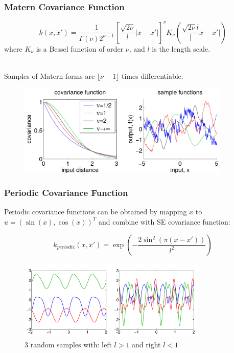 \documentclass[10pt]{beamer}
\begin{document}
  \begin{frame}
    \frametitle{Matern Covariance Function}

    \begin{equation*}
      k(x,x') = \frac{1}{\Gamma(\nu) 2^{\nu - 1}} \left[ \frac{\sqrt{2 \nu}}{l} |x - x'| \right]^{\nu} K_{\nu} \left( \frac{\sqrt{2 \nu}{l}} |x - x'| \right)
    \end{equation*}
    where $K_{\nu}$ is a Bessel function of order $\nu$, and $l$ is the length scale.\\~

    Samples of Matern forms are $\lfloor \nu - 1 \rfloor$ times differentiable.

    \begin{figure}
      \centering
      \includegraphics[width=0.9\textwidth]{maternCovFunc.png}
    \end{figure}

  \end{frame}

  \begin{frame}
    \frametitle{Periodic Covariance Function}
    Periodic covariance functions can be obtained by mapping $x$ to $u = (\sin(x), \cos(x))^T$ and combine with SE covariance function:

    \begin{equation*}
      k_{periodic} (x,x') = \exp \left( - \frac{2 \sin^2(\pi (x - x'))}{l^2} \right)
    \end{equation*}

    \begin{figure}
      \centering
      \includegraphics[width=0.8\textwidth]{periodicCovFunc.png}
      \caption*{3 random samples with: left $l > 1$ and right $l < 1$}
    \end{figure}
  \end{frame}
\end{document}
